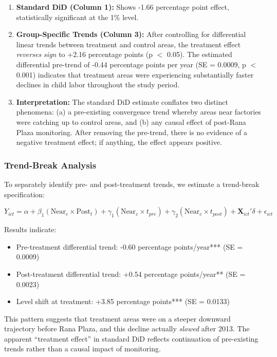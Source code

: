 \begin{enumerate}
\item \textbf{Standard DiD (Column 1):} Shows -1.66 percentage point effect, statistically significant at the 1\% level.

\item \textbf{Group-Specific Trends (Column 3):} After controlling for differential linear trends between treatment and control areas, the treatment effect \textit{reverses sign} to +2.16 percentage points (p $<$ 0.05). The estimated differential pre-trend of -0.44 percentage points per year (SE = 0.0009, p $<$ 0.001) indicates that treatment areas were experiencing substantially faster declines in child labor throughout the study period.

\item \textbf{Interpretation:} The standard DiD estimate conflates two distinct phenomena: (a) a pre-existing convergence trend whereby areas near factories were catching up to control areas, and (b) any causal effect of post-Rana Plaza monitoring. After removing the pre-trend, there is no evidence of a negative treatment effect; if anything, the effect appears positive.
\end{enumerate}

\subsubsection{Trend-Break Analysis}

To separately identify pre- and post-treatment trends, we estimate a trend-break specification:

\begin{equation}
Y_{ict} = \alpha + \beta_1 (\text{Near}_c \times \text{Post}_t) + \gamma_1 (\text{Near}_c \times t_{pre}) + \gamma_2 (\text{Near}_c \times t_{post}) + \mathbf{X}_{ict}'\delta + \epsilon_{ict}
\end{equation}

Results indicate:
\begin{itemize}
\item Pre-treatment differential trend: -0.60 percentage points/year*** (SE = 0.0009)
\item Post-treatment differential trend: +0.54 percentage points/year** (SE = 0.0023)
\item Level shift at treatment: +3.85 percentage points*** (SE = 0.0133)
\end{itemize}

This pattern suggests that treatment areas were on a steeper downward trajectory before Rana Plaza, and this decline actually \textit{slowed} after 2013. The apparent ``treatment effect'' in standard DiD reflects continuation of pre-existing trends rather than a causal impact of monitoring.

